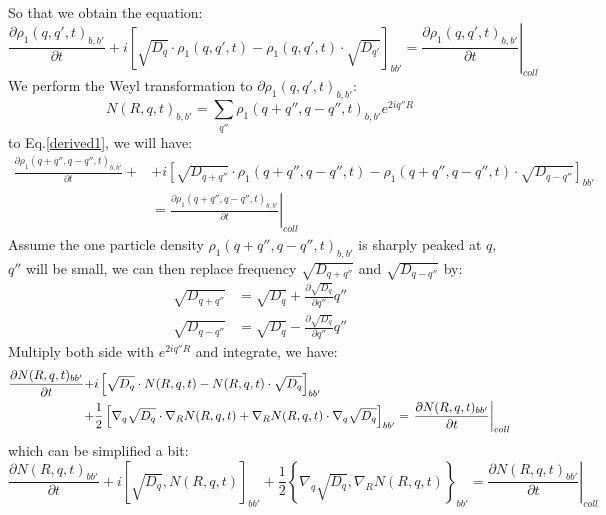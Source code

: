 \documentclass{article}
\begin{document}
So that we obtain the equation:
\begin{equation}
    \frac{\partial \rho_1(q,q',t)_{b,b'} }{\partial t} + i \left[ \sqrt{D_q}\cdot \rho_1(q,q',t) - \rho_1(q,q',t) \cdot \sqrt{D_{q'}} \right] _{bb'}
     = \left. \frac{\partial \rho_1(q,q',t)_{b,b'} }{\partial t} \right|_{coll}  \label{derived1}
\end{equation}
We perform the Weyl transformation to $\partial \rho_1(q,q',t)_{b,b'}$:
\begin{equation}
    N(R,q,t)_{b,b'} = \sum_{q''} \rho_1(q+q'',q-q'',t)_{b,b'} e^{2iq''R}
\end{equation}
to Eq.\ref{derived1}, we will have:
\begin{align}
    \frac{\partial \rho_1(q+q'',q-q'',t)_{b,b'} }{\partial t} + & + i \left[ \sqrt{D_{q+q''}}\cdot \rho_1(q+q'',q-q'',t) - \rho_1(q+q'',q-q'',t) \cdot \sqrt{D_{q-q''}} \right] _{bb'}
    \\ &= \left. \frac{\partial \rho_1(q+q'',q-q'',t)_{b,b'} }{\partial t} \right|_{coll}
\end{align}
Assume the one particle density $\rho_1(q+q'',q-q'',t)_{b,b'}$ is sharply peaked at $q$, $q''$ will be small,
we can then replace frequency $\sqrt{D_{q+q''}}$ and $\sqrt{D_{q-q''}}$ by:
\begin{align}
    \sqrt{D_{q+q''}} &= \sqrt{D_q} + \frac{\partial\sqrt{D_q}}{\partial q''} q''\\
    \sqrt{D_{q-q''}} &= \sqrt{D_q} - \frac{\partial\sqrt{D_q}}{\partial q''} q''
\end{align}
Multiply both side with $e^{2iq''R}$ and integrate, we have:
\begin{align}
    \frac{\partial N(R,q,t)_{bb'}}{\partial t} + &i \left[ \sqrt{D_q}\cdot N(R,q,t) - N(R,q,t) \cdot \sqrt{D_q} \right] _{bb'} \notag \\
    + &\frac{1}{2} \left[ \nabla_q\sqrt{D_q} \cdot \nabla_R N(R,q,t) + \nabla_R N(R,q,t) \cdot \nabla_q\sqrt{D_q}  \right]_{bb'} = \left. \frac{\partial N(R,q,t)_{bb'} }{\partial t} \right|_{coll}
\end{align}
which can be simplified a bit:
\begin{equation}
    \frac{\partial N(R,q,t)_{bb'}}{\partial t} + i \left[ \sqrt{D_q}, N(R,q,t) \right] _{bb'} 
    + \frac{1}{2} \left\{ \nabla_q\sqrt{D_q} , \nabla_R N(R,q,t) \right\}_{bb'} = \left. \frac{\partial N(R,q,t)_{bb'} }{\partial t} \right|_{coll}
\end{equation}
\end{document}

